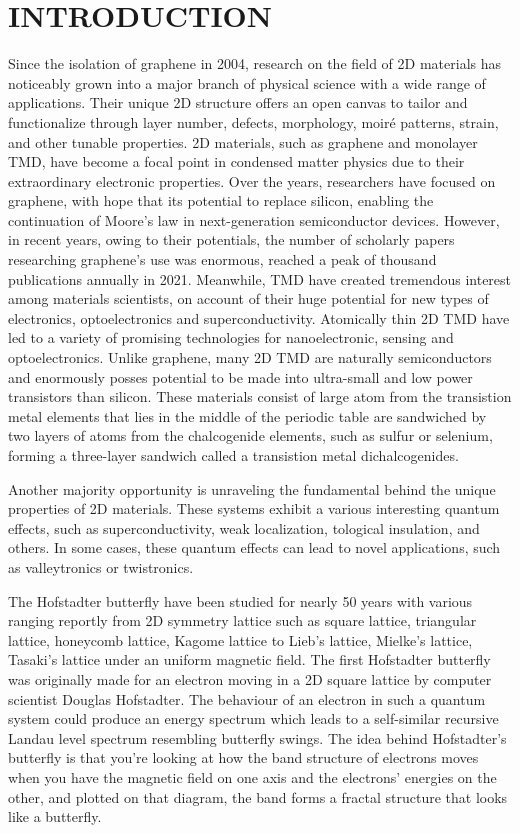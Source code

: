 \chapter{\textbf{INTRODUCTION}}
Since the isolation of graphene in 2004, research on the field of \ac{2D} materials has noticeably grown into a major branch of physical science with a wide range of applications. Their unique \ac{2D} structure offers an open canvas to tailor and functionalize through layer number, defects, morphology, moir\'e patterns, strain, and other tunable properties. \ac{2D} materials, such as graphene and monolayer \ac{TMD}, have become a focal point in condensed matter physics due to their extraordinary electronic properties. Over the years, researchers have focused on graphene, with hope that its potential to replace silicon, enabling the continuation of Moore's law in next-generation semiconductor devices. However, in recent years, owing to their potentials, the number of scholarly papers researching graphene's use was enormous, reached a peak of thousand publications annually in 2021. Meanwhile, \ac{TMD} have created tremendous interest among materials scientists, on account of their huge potential for new types of electronics, optoelectronics and superconductivity. Atomically thin \ac{2D} \ac{TMD} have led to a variety of promising technologies for nanoelectronic, sensing and optoelectronics. Unlike graphene, many \ac{2D} \ac{TMD} are naturally semiconductors and enormously posses potential to be made into ultra-small and low power transistors than silicon. These materials consist of large atom from the transistion metal elements that lies in the middle of the periodic table are sandwiched by two layers of atoms from the chalcogenide elements, such as sulfur or selenium, forming a three-layer sandwich called a transistion metal dichalcogenides.

Another majority opportunity is unraveling the fundamental behind the unique properties of \ac{2D} materials. These systems exhibit a various interesting quantum effects, such as superconductivity, weak localization, tological insulation, and others. In some cases, these quantum effects can lead to novel applications, such as valleytronics or twistronics.

The Hofstadter butterfly have been studied for nearly 50 years with various ranging reportly from \ac{2D} symmetry lattice such as square lattice, triangular lattice, honeycomb lattice, Kagome lattice to Lieb's lattice, Mielke's lattice, Tasaki's lattice under an uniform magnetic field. The first Hofstadter butterfly was originally made for an electron moving in a \ac{2D} square lattice by computer scientist Douglas Hofstadter. The behaviour of an electron in such a quantum system could produce an energy spectrum which leads to a self-similar recursive Landau level spectrum resembling butterfly swings. The idea behind Hofstadter’s butterfly is that you’re looking at how the band structure of electrons moves when you have the magnetic field on one axis and the electrons’ energies on the other, and plotted on that diagram, the band forms a fractal structure that looks like a butterfly.

